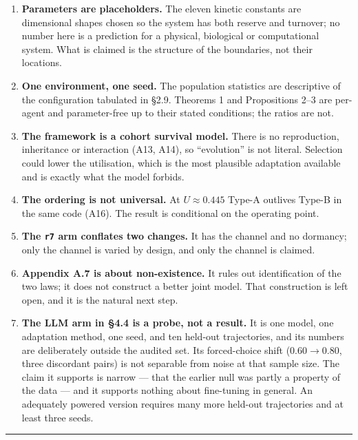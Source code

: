 \documentclass[11pt,a4paper]{article}
\begin{document}
\begin{enumerate}
\def\labelenumi{\arabic{enumi}.}
\item
  \textbf{Parameters are placeholders.} The eleven kinetic constants are dimensional
  shapes chosen so the system has both reserve and turnover; no number here is a
  prediction for a physical, biological or computational system. What is claimed
  is the structure of the boundaries, not their locations.
\item
  \textbf{One environment, one seed.} The population statistics are descriptive of the
  configuration tabulated in §2.9. Theorems 1 and Propositions 2--3 are per-agent
  and parameter-free up to their stated conditions; the ratios are not.
\item
  \textbf{The framework is a cohort survival model.} There is no reproduction,
  inheritance or interaction (A13, A14), so ``evolution'' is not literal. Selection
  could lower the utilisation, which is the most plausible adaptation available
  and is exactly what the model forbids.
\item
  \textbf{The ordering is not universal.} At \(U\approx0.445\) Type-A outlives Type-B in
  the same code (A16). The result is conditional on the operating point.
\item
  \textbf{The \texttt{r7} arm conflates two changes.} It has the channel and no dormancy; only
  the channel is varied by design, and only the channel is claimed.
\item
  \textbf{Appendix A.7 is about non-existence.} It rules out identification of the two
  laws; it does not construct a better joint model. That construction is left
  open, and it is the natural next step.
\item
  \textbf{The LLM arm in §4.4 is a probe, not a result.} It is one model, one
  adaptation method, one seed, and ten held-out trajectories, and its numbers
  are deliberately outside the audited set. Its forced-choice shift
  (\(0.60\to0.80\), three discordant pairs) is not separable from noise at that
  sample size. The claim it supports is narrow --- that the earlier null was
  partly a property of the data --- and it supports nothing about fine-tuning in
  general. An adequately powered version requires many more held-out
  trajectories and at least three seeds.
\end{enumerate}

\begin{center}\rule{0.5\linewidth}{0.5pt}\end{center}
\end{document}
